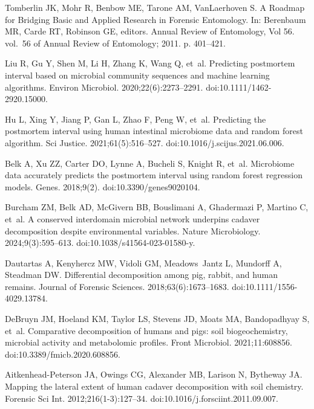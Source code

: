 \documentclass[
  10pt,
  letterpaper,
]{article}
\begin{document}
\begin{thebibliography}{10}
  Tomberlin JK, Mohr R, Benbow ME, Tarone AM, VanLaerhoven S.
  \newblock A {Roadmap} for {Bridging} {Basic} and {Applied} {Research} in
    {Forensic} {Entomology}.
  \newblock In: Berenbaum MR, Carde RT, Robinson GE, editors. Annual {Review} of
    {Entomology}, {Vol} 56. vol.~56 of Annual {Review} of {Entomology}; 2011. p.
    401--421.
  
  Liu R, Gu Y, Shen M, Li H, Zhang K, Wang Q, et~al.
  \newblock Predicting postmortem interval based on microbial community sequences
    and machine learning algorithms.
  \newblock Environ Microbiol. 2020;22(6):2273--2291.
  \newblock doi:{10.1111/1462-2920.15000}.
  
  Hu L, Xing Y, Jiang P, Gan L, Zhao F, Peng W, et~al.
  \newblock Predicting the postmortem interval using human intestinal microbiome
    data and random forest algorithm.
  \newblock Sci Justice. 2021;61(5):516--527.
  \newblock doi:{10.1016/j.scijus.2021.06.006}.
  
  Belk A, Xu ZZ, Carter DO, Lynne A, Bucheli S, Knight R, et~al.
  \newblock Microbiome data accurately predicts the postmortem interval using
    random forest regression models.
  \newblock Genes. 2018;9(2).
  \newblock doi:{10.3390/genes9020104}.
  
  Burcham ZM, Belk AD, McGivern BB, Bouslimani A, Ghadermazi P, Martino C, et~al.
  \newblock A conserved interdomain microbial network underpins cadaver
    decomposition despite environmental variables.
  \newblock Nature Microbiology. 2024;9(3):595--613.
  \newblock doi:{10.1038/s41564-023-01580-y}.
  
  Dautartas A, Kenyhercz MW, Vidoli GM, Meadows~Jantz L, Mundorff A, Steadman DW.
  \newblock Differential decomposition among pig, rabbit, and human remains.
  \newblock Journal of Forensic Sciences. 2018;63(6):1673--1683.
  \newblock doi:{10.1111/1556-4029.13784}.
  
  DeBruyn JM, Hoeland KM, Taylor LS, Stevens JD, Moats MA, Bandopadhyay S, et~al.
  \newblock Comparative decomposition of humans and pigs: soil biogeochemistry,
    microbial activity and metabolomic profiles.
  \newblock Front Microbiol. 2021;11:608856.
  \newblock doi:{10.3389/fmicb.2020.608856}.
  
  Aitkenhead-Peterson JA, Owings CG, Alexander MB, Larison N, Bytheway JA.
  \newblock Mapping the lateral extent of human cadaver decomposition with soil
    chemistry.
  \newblock Forensic Sci Int. 2012;216(1-3):127--34.
  \newblock doi:{10.1016/j.forsciint.2011.09.007}.
  

\end{thebibliography}
\end{document}
